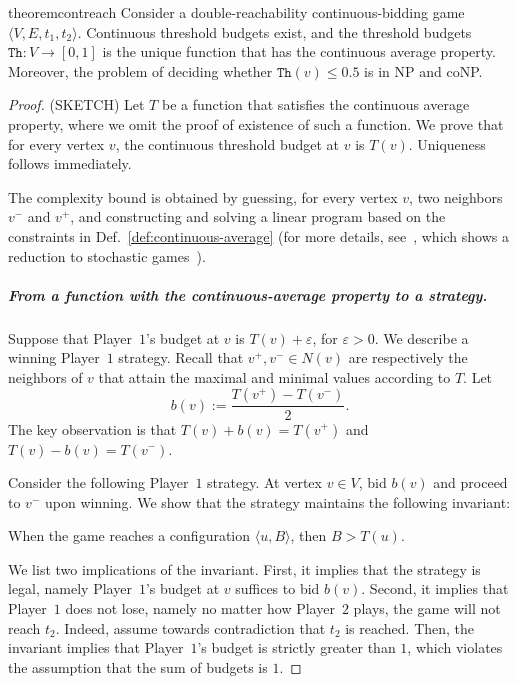 \documentclass{theoretics}
\newcommand{\PO}{Player~$1$\xspace}
\newcommand{\PT}{Player~$2$\xspace}
\newcommand{\thresh}{\texttt{Th}\xspace}
\newcommand{\zug}[1]{\langle #1  \rangle}
\newcommand{\eps}{\varepsilon}
\begin{document}
\begin{restatable}{theorem}{contreach}
\label{thm:cont-reach}
\cite{LLPU96,LLPSU99}
Consider a double-reachability continuous-bidding game $\zug{V, E, t_1, t_2}$. Continuous threshold budgets exist, and the threshold budgets $\thresh: V \rightarrow [0,1]$ is the unique function that has the continuous average property. Moreover, the problem of deciding whether $\thresh(v) \leq 0.5$ is in NP and coNP.
\end{restatable}
\begin{proof}
(SKETCH)
Let $T$ be a function that satisfies the continuous average property, where we omit the proof of existence of such a function. We prove that for every vertex $v$, the continuous threshold budget at $v$ is $T(v)$. Uniqueness follows immediately. 

The complexity bound is obtained by guessing, for every vertex $v$, two neighbors $v^-$ and $v^+$, and constructing and solving a linear program based on the constraints in Def.~\ref{def:continuous-average} (for more details, see~\cite{AHC19}, which shows a reduction to stochastic games~\cite{Con92}). 

\subparagraph*{From a function with the continuous-average property to a strategy.}
Suppose that \PO's budget at $v$ is $T(v) + \eps$, for $\eps > 0$. We describe a winning \PO strategy. 
Recall that $v^+, v^- \in N(v)$ are respectively the neighbors of $v$ that attain the maximal and minimal values according to $T$. Let 
\[b(v) := \frac{T(v^+) - T(v^-)}{2}.\]
The key observation is that $T(v) + b(v) = T(v^+)$ and $T(v)-b(v) = T(v^-)$.

Consider the following \PO strategy. At vertex $v \in V$, bid $b(v)$ and proceed to $v^-$ upon winning. We show that the strategy maintains the following invariant:

When the game reaches a configuration $\zug{u, B}$, then $B > T(u)$. 

We list two implications of the invariant. First, it implies that the strategy is legal, namely \PO's budget at $v$ suffices to bid $b(v)$. 
Second, it implies that \PO does not lose, namely no matter how \PT plays, the game will not reach $t_2$. Indeed, assume towards contradiction that $t_2$ is reached. Then, the invariant implies that \PO's budget is strictly greater than $1$, which violates the assumption that the sum of budgets is $1$.


\end{proof}
\end{document}
